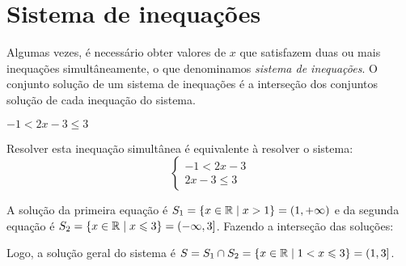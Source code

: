 \section{Sistema de inequações}

Algumas vezes, é necessário obter valores de $x$ que satisfazem duas ou mais inequações simultâneamente, o que denominamos \emph{sistema de inequações}. O conjunto solução de um sistema de inequações é a interseção dos conjuntos solução de cada inequação do sistema.

\begin{exem}
    $-1<2x-3\leqslant 3$

    Resolver esta inequação simultânea é equivalente à resolver o sistema:
    \begin{equation*}
    \left\{
        \begin{matrix}
            -1<2x-3\\
            2x-3\leqslant 3
        \end{matrix}
    \right.
    \end{equation*}

    A solução da primeira equação é $S_1=\{x\in\mathbb{R} \mid x>1\}=(1,+\infty)$ e da segunda equação é $S_2=\{x\in\mathbb{R} \mid x\leqslant 3\}=(-\infty,3]$. Fazendo a interseção das soluções:
    \begin{intervaloper}[3]{0}{4}
    \end{intervaloper}
    
    Logo, a solução geral do sistema é $S=S_1\cap S_2 = \{x\in\mathbb{R} \mid 1< x\leqslant 3\}=(1,3]$.
\end{exem}

